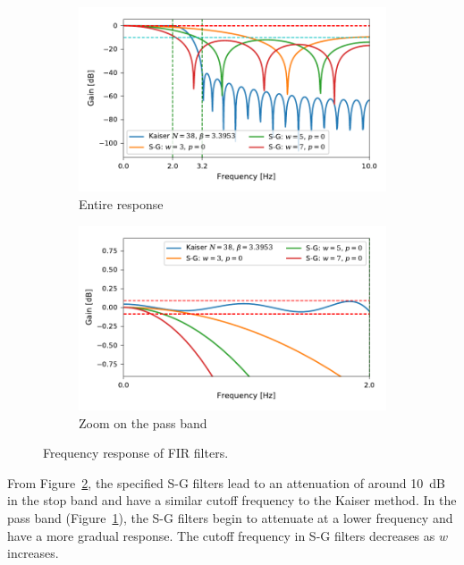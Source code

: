 \documentclass[a4paper,11pt]{article}
\begin{document}
\begin{figure}
    \centering
    \begin{subfigure}{\textwidth}
        \includegraphics{kaiser_win_freq-response.pdf}
        \caption{Entire response}
    \end{subfigure}

    \begin{subfigure}{\textwidth}
        \includegraphics{kaiser_win_freq-response_zoom.pdf}
        \caption{Zoom on the pass band}
        \label{fig:freq-response-zoom}
    \end{subfigure}
    \caption{Frequency response of FIR filters.}
    \label{fig:filter-freq-response}
\end{figure}


From Figure~\ref{fig:filter-freq-response}, the specified S-G filters lead to an attenuation of around 10~dB in the stop band and have a similar cutoff frequency to the Kaiser method.
In the pass band (Figure~\ref{fig:freq-response-zoom}), the S-G filters begin to attenuate at a lower frequency and have a more gradual response.
The cutoff frequency in S-G filters decreases as $w$ increases.
\end{document}
